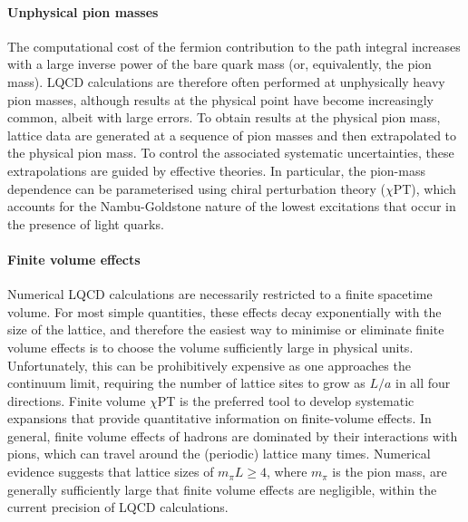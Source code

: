 \paragraph{Unphysical pion masses} 
The computational cost of the fermion contribution to the path
integral increases with a large inverse power of the bare quark mass
(or, equivalently, the pion mass). LQCD calculations are therefore
often performed at unphysically heavy pion masses, although results at
the physical point have become increasingly common, albeit with large
errors. To obtain results at the physical pion mass, lattice data are
generated at a sequence of pion masses and then extrapolated to the
physical pion mass. To control the associated systematic
uncertainties, these extrapolations are guided by effective
theories. In particular, the pion-mass dependence can be parameterised
using chiral perturbation theory ($\chi$PT), which accounts for the
Nambu-Goldstone nature of the lowest excitations that occur in the
presence of light quarks.

\paragraph{Finite volume effects} Numerical LQCD 
calculations are necessarily restricted to a finite spacetime
volume. For most simple quantities, these effects decay exponentially
with the size of the lattice, and therefore the easiest way to
minimise or eliminate finite volume effects is to choose the volume
sufficiently large in physical units. Unfortunately, this can be
prohibitively expensive as one approaches the continuum limit, requiring the
number of lattice sites to grow as $L/a$ in all four directions. Finite volume $\chi$PT is the preferred
tool to develop systematic expansions that provide quantitative
information on finite-volume effects. In general, finite volume
effects of hadrons are dominated by their interactions with pions,
which can travel around the (periodic) lattice many times. Numerical
evidence suggests that lattice sizes of $m_\pi L \geq 4$, where
$m_\pi$ is the pion mass, are generally sufficiently large that finite
volume effects are negligible, within the current precision of LQCD
calculations.

